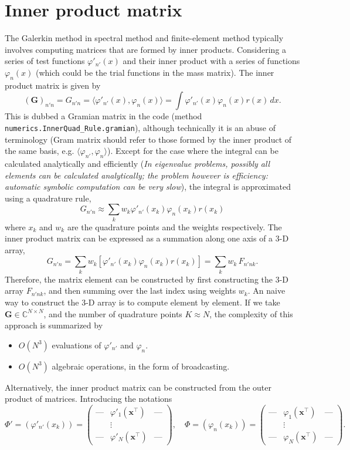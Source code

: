 \section{Inner product matrix}

The Galerkin method in spectral method and finite-element method typically involves computing matrices that are formed by inner products. Considering a series of test functions $\varphi'_{n'}(x)$ and their inner product with a series of functions $\varphi_n(x)$ (which could be the trial functions in the mass matrix). The inner product matrix is given by
\[
(\mathbf{G})_{n'n} = G_{n'n} = \langle \varphi'_{n'}(x), \varphi_n(x)\rangle = \int \varphi'_{n'}(x) \varphi_n(x) r(x)\,dx.
\]
This is dubbed a Gramian matrix in the code (method \texttt{numerics.InnerQuad\_Rule.gramian}), although technically it is an abuse of terminology (Gram matrix should refer to those formed by the inner product of the same basis, e.g. $\langle \varphi_{n'}, \varphi_n\rangle$).
Except for the case where the integral can be calculated analytically and efficiently (\textit{In eigenvalue problems, possibly all elements can be calculated analytically; the problem however is efficiency: automatic symbolic computation can be very slow}), the integral is approximated using a quadrature rule,
\[
    G_{n'n} \approx \sum_{k} w_k \varphi'_{n'}(x_k) \varphi_n (x_k) r(x_k)
\]
where $x_k$ and $w_k$ are the quadrature points and the weights respectively.
The inner product matrix can be expressed as a summation along one axis of a 3-D array,
\[
G_{n'n} = \sum_k w_k [\varphi'_{n'}(x_k) \varphi_n (x_k) r(x_k)] = \sum_k w_k \, F_{n'nk}.
\]
Therefore, the matrix element can be constructed by first constructing the 3-D array $F_{n'nk}$, and then summing over the last index using weights $w_k$.
An naive way to construct the 3-D array is to compute element by element.
If we take $\mathbf{G} \in \mathbb{C}^{N\times N}$, and the number of quadrature points $K\approx N$, the complexity of this approach is summarized by
\begin{itemize}
    \item $O(N^3)$ evaluations of $\varphi'_{n'}$ and $\varphi_n$.
    \item $O(N^3)$ algebraic operations, in the form of broadcasting.
\end{itemize}
Alternatively, the inner product matrix can be constructed from the outer product of matrices. Introducing the notations
\[
    \Phi' = (\varphi'_{n'}(x_k)) = \begin{pmatrix}
        \text{---} & \varphi'_1(\mathbf{x}^\intercal) & \text{---} \\
         & \vdots & \\ 
        \text{---} & \varphi'_N(\mathbf{x}^\intercal) & \text{---}
    \end{pmatrix}, \quad 
    \Phi = (\varphi_{n}(x_k)) =  \begin{pmatrix}
        \text{---} & \varphi_1(\mathbf{x}^\intercal) & \text{---} \\
         & \vdots & \\ 
        \text{---} & \varphi_N(\mathbf{x}^\intercal) & \text{---}
    \end{pmatrix}.
\]
